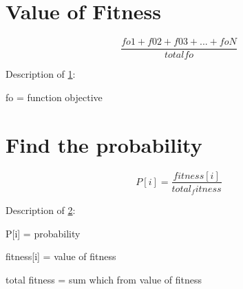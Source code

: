 
\section{Value of Fitness} 
    \label{fitness}
    \begin{equation}
        \frac{fo1 + f02 + f03 + ... + foN}{total fo}
    \end{equation}
    \par Description of \ref{fitness}:
    \par fo = function objective

\section{Find the probability} 
    \label{ptobabilty}
    \begin{equation}
        P[i] = \frac{fitness[i]}{total_fitness}
    \end{equation}
    \par Description of \ref{ptobabilty}:
    \par P[i] = probability
    \par fitness[i] = value of fitness
    \par total fitness = sum which from value of fitness 